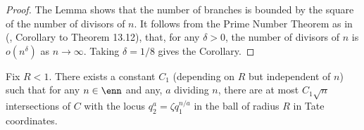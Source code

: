 \documentclass[12pt,letterpaper]{article}
\begin{document}
	\begin{proof}
		The Lemma shows that the number of branches is bounded by the square of the number of divisors of $n$. It follows from the Prime Number Theorem as in (\cite{Apo76}, Corollary to Theorem 13.12), that, for any $\delta>0$, the number of divisors of $n$ is $o(n^\delta)$ as $n\to \infty$. Taking $\delta =1/8$ gives the Corollary. 
	\end{proof}
	
	
	\begin{prop}\label{Tatesingletorus}
		Fix $R<1$. There exists a constant $C_1$ (depending on $R$ but independent of $n$) such that for any $n\in\enn$ and any, $a$ dividing $n$, there are at most $C_1\sqrt{n}$ intersections of $C$ with the locus $q_2^a = \zeta q_1^{n/a}$ in the ball of radius $R$ in Tate coordinates.

	\end{prop}
	
\end{document}
